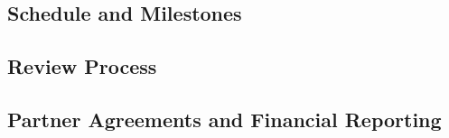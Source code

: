 \subsection{Schedule and Milestones}

\subsection{Review Process}

\subsection{Partner Agreements and Financial Reporting}








